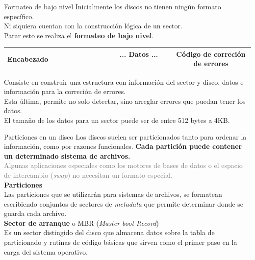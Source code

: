 \documentclass[aspectratio=169]{beamer}
\begin{document}
\begin{frame}{Formateo de bajo nivel}
    Inicialmente los discos no tienen ningún formato específico.\\
    Ni siquiera cuentan con la construcción lógica de un sector.\\
    \bigskip
    Parar esto se realiza el \textbf{formateo de bajo nivel}.\\
    \medskip
    \begin{center}
    \begin{tabular}{|c|c|c|}
    \hline
    Encabezado & \ \ \ \ \ \ \ \ \ \ \ \ \ \ ... Datos ... \ \ \ \ \ \ \ \ \ \ \ \ \ \ & Código de correción de errores\\
    \hline
    \end{tabular}
    \end{center}
    \pause
    \bigskip
    \textcolor{verdeuca}{
    Consiste en construir una estructura con información del sector y disco, datos e información para la correción de errores.\\
    Esta última, permite no solo detectar, sino arreglar errores que puedan tener los datos.}\\
    \medskip
    El tamaño de los datos para un sector puede ser de entre 512 bytes a 4KB.\\
\end{frame}

\begin{frame}{Particiones en un disco}
    Los discos suelen ser particionados tanto para ordenar la información, como por razones funcionales.
    \textbf{Cada partición puede contener un determinado sistema de archivos.}\\
    \bigskip
    \textcolor{gray}{Algunas aplicaciones especiales como los motores de bases de datos o el espacio de intercambio (\emph{swap}) no necesitan un formato especial.}\\
    \bigskip
    \pause
    \textcolor{naranjauca}{\textbf{Particiones}}\\
    Las particiones que se utilizarán para sistemas de archivos, se formatean escribiendo conjuntos de sectores de \emph{metadata} que permite determinar donde se guarda cada archivo.\\
    \bigskip
    \pause
    \textcolor{naranjauca}{\textbf{Sector de arranque}} o \textcolor{naranjauca}{MBR (\textit{Master-boot Record})}\\
    Es un sector distingido del disco que almacena datos sobre la tabla de particionado y rutinas de código básicas que sirven como el primer paso en la carga del sistema operativo.
\end{frame}
\end{document}
